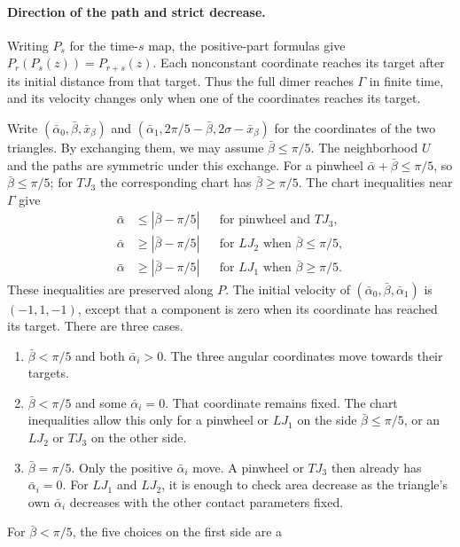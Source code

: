 \paragraph{Direction of the path and strict decrease.}
Writing $P_s$ for the time-$s$ map, the positive-part formulas give
$P_r(P_s(z))=P_{r+s}(z)$. Each nonconstant coordinate reaches its
target after its initial distance from that target. Thus the full
dimer reaches $\Gamma$ in finite time, and its velocity changes only
when one of the coordinates reaches its target.

Write $(\bar\alpha_0,\bar\beta,\bar x_\beta)$ and
$(\bar\alpha_1,2\pi/5-\bar\beta,2\sigma-\bar x_\beta)$ for the
coordinates of the two triangles. By exchanging them, we may assume
$\bar\beta\le\pi/5$. The neighborhood $U$ and the paths are symmetric
under this exchange. For a pinwheel $\bar\alpha+\bar\beta\le\pi/5$,
so $\bar\beta\le\pi/5$; for $TJ_3$ the corresponding chart has
$\bar\beta\ge\pi/5$. The chart inequalities near $\Gamma$ give
\[
\begin{aligned}
\bar\alpha&\le|\bar\beta-\pi/5|
 &&\text{for pinwheel and $TJ_3$},\\
\bar\alpha&\ge|\bar\beta-\pi/5|
 &&\text{for $LJ_2$ when $\bar\beta\le\pi/5$},\\
\bar\alpha&\ge|\bar\beta-\pi/5|
 &&\text{for $LJ_1$ when $\bar\beta\ge\pi/5$}.
\end{aligned}
\]
These inequalities are preserved along $P$. The initial velocity of
$(\bar\alpha_0,\bar\beta,\bar\alpha_1)$ is $(-1,1,-1)$, except
that a component is zero when its coordinate has reached its target.
There are three cases.
\begin{enumerate}
\item $\bar\beta<\pi/5$ and both $\bar\alpha_i>0$. The three
  angular coordinates move towards their targets.
\item $\bar\beta<\pi/5$ and some $\bar\alpha_i=0$. That coordinate
  remains fixed. The chart inequalities allow this only for a
  pinwheel or $LJ_1$ on the side $\bar\beta\le\pi/5$, or an
  $LJ_2$ or $TJ_3$ on the other side.
\item $\bar\beta=\pi/5$. Only the positive $\bar\alpha_i$ move.
  A pinwheel or $TJ_3$ then already has $\bar\alpha_i=0$.
  For $LJ_1$ and $LJ_2$, it is enough to check area decrease as
  the triangle's own $\bar\alpha_i$ decreases with the other
  contact parameters fixed.
\end{enumerate}
For $\bar\beta<\pi/5$, the five choices on the first side are a
